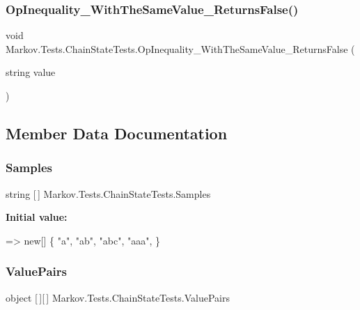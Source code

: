 \subsubsection{\texorpdfstring{Op\+Inequality\+\_\+\+With\+The\+Same\+Value\+\_\+\+Returns\+False()}{OpInequality\_WithTheSameValue\_ReturnsFalse()}}
{\footnotesize\ttfamily void Markov.\+Tests.\+Chain\+State\+Tests.\+Op\+Inequality\+\_\+\+With\+The\+Same\+Value\+\_\+\+Returns\+False (\begin{DoxyParamCaption}\item[{string}]{value }\end{DoxyParamCaption})}



\subsection{Member Data Documentation}
\mbox{\label{class_markov_1_1_tests_1_1_chain_state_tests_ab07b0e6dcc3273b5cd6321278394e79f}} 
\subsubsection{\texorpdfstring{Samples}{Samples}}
{\footnotesize\ttfamily string \mbox{[}$\,$\mbox{]} Markov.\+Tests.\+Chain\+State\+Tests.\+Samples\hspace{0.3cm}{\ttfamily [static]}}

{\bfseries Initial value\+:}
\begin{DoxyCode}
=> \textcolor{keyword}{new}[]
        \{
            \textcolor{stringliteral}{"a"},
            \textcolor{stringliteral}{"ab"},
            \textcolor{stringliteral}{"abc"},
            \textcolor{stringliteral}{"aaa"},
        \}
\end{DoxyCode}
\mbox{\label{class_markov_1_1_tests_1_1_chain_state_tests_a6f995526349802f9aeb21d1f754727c4}} 
\subsubsection{\texorpdfstring{Value\+Pairs}{ValuePairs}}
{\footnotesize\ttfamily object \mbox{[}$\,$\mbox{]}\mbox{[}$\,$\mbox{]} Markov.\+Tests.\+Chain\+State\+Tests.\+Value\+Pairs\hspace{0.3cm}{\ttfamily [static]}}

